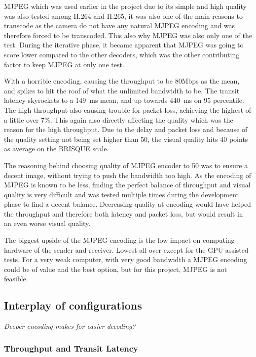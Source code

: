MJPEG which was used earlier in the project due to its simple and high quality was also tested among H.264 and H.265, it was also one of the main reasons to transcode as the camera do not have any natural MJPEG encoding and was therefore forced to be transcoded. This also why MJPEG was also only one of the test. During the iterative phase, it became apparent that MJPEG was going to score lower compared to the other decoders, which was the other contributing factor to keep MJPEG at only one test.

With a horrible encoding, causing the throughput to be 80Mbps as the mean, and spikes to hit the roof of what the unlimited bandwidth to be. The transit latency skyrockets to a 149~ms mean, and up towards 440~ms on 95 percentile. The high throughput also causing trouble for packet loss, achieving the highest of a little over 7\%. This again also directly affecting the quality which was the reason for the high throughput. Due to the delay and packet loss and because of the quality setting not being set higher than 50, the visual quality hits 40 points as average on the BRISQUE scale. 

The reasoning behind choosing quality of MJPEG encoder to 50 was to ensure a decent image, without trying to push the bandwidth too high. As the encoding of MJPEG is known to be less, finding the perfect balance of throughput and visual quality is very difficult and was tested multiple times during the development phase to find a decent balance. Decreasing quality at encoding would have helped the throughput and therefore both latency and packet loss, but would result in an even worse visual quality. 

The biggest upside of the MJPEG encoding is the low impact on computing hardware of the sender and receiver. Lowest all over except for the GPU assisted tests. For a very weak computer, with very good bandwidth a MJPEG encoding could be of value and the best option, but for this project, MJPEG is not feasible.

\subsection{Interplay of configurations}\label{subsec:discInterplay}



\textit{Deeper encoding makes for easier decoding?}

\subsubsection{Throughput and Transit Latency}

